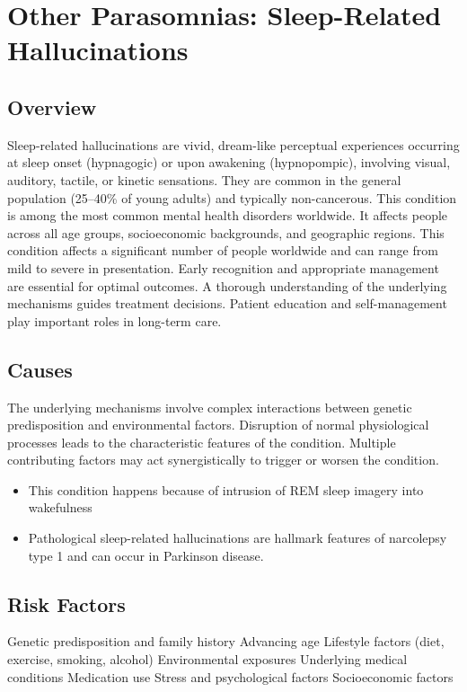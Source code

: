 \chapter{Other Parasomnias: Sleep-Related Hallucinations}
\label{sec:Sleep-Related Hallucinations}

\section{Overview}
Sleep-related hallucinations are vivid, dream-like perceptual experiences occurring at sleep onset (hypnagogic) or upon awakening (hypnopompic), involving visual, auditory, tactile, or kinetic sensations. They are common in the general population (25--40\% of young adults) and typically non-cancerous. This condition is among the most common mental health disorders worldwide. It affects people across all age groups, socioeconomic backgrounds, and geographic regions. This condition affects a significant number of people worldwide and can range from mild to severe in presentation. Early recognition and appropriate management are essential for optimal outcomes. A thorough understanding of the underlying mechanisms guides treatment decisions. Patient education and self-management play important roles in long-term care.
\section{Causes}
The underlying mechanisms involve complex interactions between genetic predisposition and environmental factors. Disruption of normal physiological processes leads to the characteristic features of the condition. Multiple contributing factors may act synergistically to trigger or worsen the condition.

\begin{itemize}[noitemsep]
  \item This condition happens because of intrusion of REM sleep imagery into wakefulness
  \item Pathological sleep-related hallucinations are hallmark features of narcolepsy type 1 and can occur in Parkinson disease.
\end{itemize}
\section{Risk Factors}
Genetic predisposition and family history Advancing age Lifestyle factors (diet, exercise, smoking, alcohol) Environmental exposures Underlying medical conditions Medication use Stress and psychological factors Socioeconomic factors

